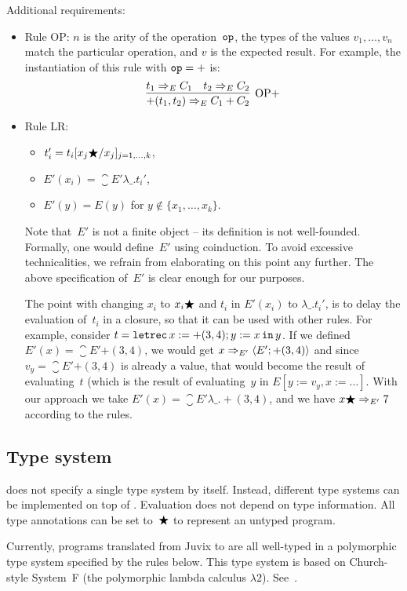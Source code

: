 \documentclass[
    9pt,            %
    techreport,        %
    affiltop,       %
]{art}
\begin{document}
Additional requirements:
\begin{itemize}
\item Rule OP: $n$ is the arity of the operation~$\mathtt{op}$, the types of the values $v_1,\ldots,v_n$ match the particular operation, and $v$ is the expected result. For example, the instantiation of this rule with $\mathtt{op} = {+}$ is:
\[
\infer[\mathrm{OP}{+}]{\eval{{+}(t_1,t_2)}{E}{C_1 + C_2}}{\eval{t_1}{E}{C_1} & \eval{t_2}{E}{C_2}}
\]
\item Rule LR:
    \begin{itemize}
    \item $t_i' = t_i[x_j\bigstar/x_j]_{j=1,\ldots,k}$,
    \item $E'(x_i) = \closure{E'}{\lambda \_ . t_i'}$,
    \item $E'(y) = E(y)$ for $y \notin \{x_1,\ldots,x_k\}$.
    \end{itemize}
    Note that~$E'$ is not a finite object -- its definition is not well-founded. Formally, one would define~$E'$ using coinduction. To avoid excessive technicalities, we refrain from elaborating on this point any further. The above specification of~$E'$ is clear enough for our purposes.

    The point with changing $x_i$ to $x_i \bigstar$ and $t_i$ in $E'(x_i)$ to $\lambda \_ . t_i'$, is to delay the evaluation of~$t_i$ in a closure, so that it can be used with other rules. For example, consider $t = \mathtt{letrec}\,x := {+}(3,4); y := x\,\mathtt{in}\,y$. If we defined $E'(x) = \closure{E'}{{+}(3,4)}$, we would get $x\Rightarrow_{E'} \langle E'; {+}(3,4) \rangle$ and since $v_y = \closure{E'}{{+}(3,4)}$ is already a value, that would become the result of evaluating~$t$ (which is the result of evaluating~$y$ in $E[y:=v_y,x:=\ldots]$. With our approach we take $E'(x) = \closure{E'}{\lambda \_ . {+}(3,4)}$, and we have $x\bigstar\Rightarrow_{E'} 7$ according to the rules.
\end{itemize}

\subsection{Type system}\label{sec_type_system}

\JuvixCore{} does not specify a single type system by itself. Instead, different type systems can be implemented on top of \JuvixCore{}. Evaluation does not depend on type information. All type annotations can be set to~$\bigstar$ to represent an untyped program.

Currently, programs translated from Juvix to \JuvixCore{} are all well-typed in a polymorphic type system specified by the rules below. This type system is based on Church-style System~F (the polymorphic lambda calculus $\lambda2$). See~\cite[Section~5]{lambda-calculi-with-types}.
\end{document}
